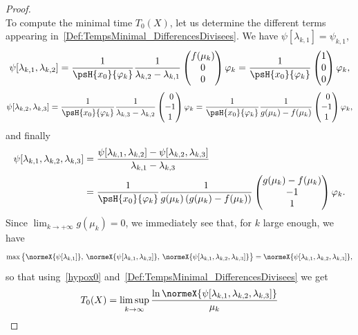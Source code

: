 \begin{proof}
\[\]
To compute the minimal time $T_0(X)$, let us determine the different terms appearing in~\eqref{Def:TempsMinimal_DifferencesDivisees}. We have $\psi[\lambda_{k,1}]=\psi_{k,1}$,
\[
\psi[\lambda_{k,1}, \lambda_{k,2}] = \frac{1}{\psH{x_0}{\varphi_k}} \frac{1}{\lambda_{k,2}-\lambda_{k,1}}
\begin{pmatrix}
f(\mu_k) \\ 0 \\ 0
\end{pmatrix} \varphi_k = \frac{1}{\psH{x_0}{\varphi_k}}
\begin{pmatrix}
1 \\ 0 \\ 0
\end{pmatrix} \varphi_k,
\]
\[
\psi[\lambda_{k,2}, \lambda_{k,3}] = \frac{1}{\psH{x_0}{\varphi_k}} \frac{1}{\lambda_{k,3}-\lambda_{k,2}}
\begin{pmatrix}
\ 0\\-1\\1
\end{pmatrix} \varphi_k
= \frac{1}{\psH{x_0}{\varphi_k}} \frac{1}{g(\mu_k) - f(\mu_k)}
\begin{pmatrix}
\ 0\\-1\\1
\end{pmatrix} \varphi_k,
\]
and finally
\begin{align*}
\psi[\lambda_{k,1},\lambda_{k,2},\lambda_{k,3}] &= \frac{\psi[\lambda_{k,1},\lambda_{k,2}]-\psi[\lambda_{k,2},\lambda_{k,3}]}{\lambda_{k,1}-\lambda_{k,3}}
\\
&= \frac{1}{\psH{x_0}{\varphi_k}} \frac{1}{g(\mu_k) \left(g(\mu_k)-f(\mu_k) \right)}
\begin{pmatrix} g(\mu_k)-f(\mu_k) \\ -1 \\ 1
\end{pmatrix} \varphi_k.
\end{align*}
Since $\lim_{k\to +\infty} g(\mu_k)=0$, we immediately see that, for $k$ large enough, we have
\[
\max \big\{ \normeX{\psi[\lambda_{k,1}]}, \: \normeX{\psi[\lambda_{k,1},\lambda_{k,2}]}, \: \normeX{\psi[\lambda_{k,1},\lambda_{k,2},\lambda_{k,3}]} \big\} = \normeX{\psi[\lambda_{k,1},\lambda_{k,2},\lambda_{k,3}]},
\]
so that using~\eqref{hypox0} and~\eqref{Def:TempsMinimal_DifferencesDivisees} we get
\begin{equation}\label{T0_fg}
\begin{aligned}
T_0(X) &= \limsup_{k \to \infty} \frac{ \ln \normeX{ \psi[\lambda_{k,1}, \lambda_{k,2}, \lambda_{k,3}]} }{\mu_k} \\

\end{aligned}
\end{equation}
\end{proof}
